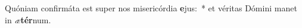 \item Quóniam confirmáta est super nos misericórdia \textbf{e}jus:~* et véritas Dómini manet in \textit{æ}\textbf{tér}num.
